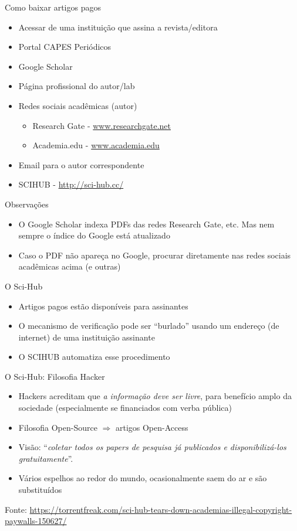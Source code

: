 \documentclass{beamer}
\begin{document}
\begin{frame}{Como baixar artigos pagos}
  \begin{itemize}
  \item Acessar de uma instituição que assina a revista/editora
  \item Portal CAPES Periódicos
  \item Google Scholar
  \item Página profissional do autor/lab
  \item Redes sociais acadêmicas (autor)
    \begin{itemize}
    \item Research Gate - \url{www.researchgate.net}
    \item Academia.edu - \url{www.academia.edu}
    \end{itemize}
  \item Email para o autor correspondente
  \item SCIHUB - \url{http://sci-hub.cc/}
  \end{itemize}
\end{frame}

\begin{frame}{Observações}
  \begin{itemize}
  \item O Google Scholar indexa PDFs das redes Research Gate, etc. Mas
    nem sempre o índice do Google está atualizado
  \item Caso o PDF não apareça no Google, procurar diretamente nas
    redes sociais acadêmicas acima (e outras)
  \end{itemize}
\end{frame}

\begin{frame}{O Sci-Hub}
  \begin{itemize}
  \item Artigos pagos estão disponíveis para assinantes
  \item O mecanismo de verificação pode ser ``burlado'' usando um
    endereço (de internet) de uma instituição assinante
  \item O SCIHUB automatiza esse procedimento
  \end{itemize}
\end{frame}

\begin{frame}{O Sci-Hub: Filosofia Hacker}
  \begin{itemize}
  \item Hackers acreditam que {\em a informação deve ser livre}, para
    benefício amplo da sociedade (\alert{especialmente} se financiados
    com verba pública)
  \item Filosofia Open-Source $\Rightarrow$ artigos Open-Access
  \item Visão: ``{\em coletar todos os papers de pesquisa já
      publicados e disponibilizá-los gratuitamente}''.
  \item Vários espelhos ao redor do mundo, ocasionalmente saem do ar e
    são substituídos
  \end{itemize}

  Fonte: \url{https://torrentfreak.com/sci-hub-tears-down-academias-illegal-copyright-paywalls-150627/}
\end{frame}
\end{document}
